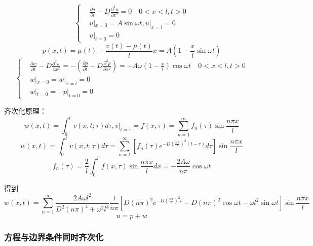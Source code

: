 \begin{ex}[温度周期边界条件]
$$\left\{
    \begin{aligned}
        &\frac{\partial{u}}{\partial{t}}-D\frac{\partial^2{u}}{\partial{x}^2}=0\quad 0<x<l,t>0\\
        &u|_{x=0}=A\sin\omega t, u|_{x=l}=0\\
        &u|_{t=0}=0
    \end{aligned}
\right.$$
$$p(x,t)=\mu(t)+\frac{v(t)-\mu(t)}{l}x=A(1-\frac{x}{l}\sin\omega t)$$
$$\left\{
    \begin{aligned}
        &\frac{\partial{w}}{\partial{t}}-D\frac{\partial^2{w}}{\partial{x}^2}=-\left(\frac{\partial{p}}{\partial{t}}-D\frac{\partial^2{p}}{\partial{x}^2}\right)=-A\omega(1-\frac{x}{l})\cos\omega t\quad 0<x<l,t>0\\
        &w|_{x=0}=w|_{x=l}=0\\
        &w|_{t=0}=-p|_{t=0}=0
     \end{aligned}
\right.$$

齐次化原理：
$$w(x,t)=\int_0^tv(x,t;\tau)d\tau,v|_{t=\tau}=f(x,\tau)=\sum_{n=1}^\infty f_n(\tau)\sin{\frac{n\pi x}{l}}$$
$$w(x,t)=\int_0^tv(x,t;\tau)d\tau=\sum_{n=1}^\infty\left[f_n(\tau)e^{-D(\frac{n\pi}{l})^2(t-\tau)}d\tau\right]\sin\frac{n\pi x}{l}$$
$$f_n(\tau)=\frac{2}{l}\int_0^lf(x,\tau)\sin\frac{n\pi x}{l}dx=-\frac{2A\omega}{n\pi}\cos\omega t$$

得到
$$w(x,t)=\sum_{n=1}^\infty\frac{2A\omega l^2}{D^2(n\pi)^4+\omega^2l^4}\frac{1}{n\pi}\left[D(n\pi)^2e^{-D(\frac{n\pi}{l})^2t}-D(n\pi)^2\cos\omega t-\omega l^2\sin\omega t\right]\sin\frac{n\pi x}{l}$$
$$u=p+w$$
\end{ex}
\subsubsection{方程与边界条件同时齐次化}


